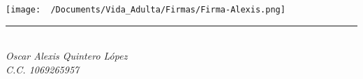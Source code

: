 \vspace*{\fill} %
\noindent
\begin{flushright}
    \texttt{[image: ~/Documents/Vida\_Adulta/Firmas/Firma-Alexis.png]}\\[-1ex]
    \vspace*{-0.6cm} %
    \rule{4.5cm}{1pt}\\
    \textit{Oscar Alexis Quintero López}\\
    \textit{C.C. 1069265957}%
    \vspace*{4mm}
    \end{flushright}
